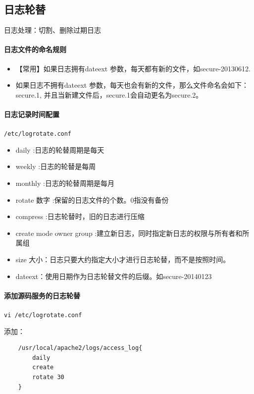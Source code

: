 \documentclass[UTF8,a4paper,12pt]{ctexbook}
\begin{document}
		\subsection{日志轮替}
			日志处理：切割、删除过期日志
			
			\paragraph{日志文件的命名规则}
				\begin{itemize}
					\item 【常用】如果日志拥有dateext 参数，每天都有新的文件，如secure-20130612.
					\item 如果日志不拥有dateext 参数，每天也会有新的文件，那么文件命名会如下：secure.1, 并且当新建文件后，secure.1会自动更名为secure.2。
				\end{itemize}
				
			
			\paragraph{日志记录时间配置}\verb|/etc/logrotate.conf|
				\begin{itemize}
					\item daily :日志的轮替周期是每天
					\item weekly :日志的轮替是每周
					\item monthly :日志的轮替周期是每月
					\item rotate 数字 :保留的日志文件的个数。0指没有备份
					\item compress :日志轮替时，旧的日志进行压缩
					\item create mode owner group :建立新日志，同时指定新日志的权限与所有者和所属组
					\item size 大小：日志只要大约指定大小才进行日志轮替，而不是按照时间。
					\item dateext：使用日期作为日志轮替文件的后缀。如secure-20140123
				\end{itemize}
				
			\paragraph{添加源码服务的日志轮替}
				\verb|vi /etc/logrotate.conf|
				
				添加：
				\begin{lstlisting}
	/usr/local/apache2/logs/access_log{
		daily
		create
		rotate 30
	}
				\end{lstlisting}
			
\end{document}
